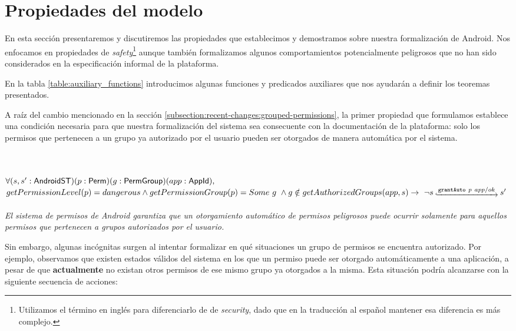 \section{Propiedades del modelo}

En esta sección presentaremos y discutiremos las propiedades que establecimos y demostramos sobre
nuestra formalización de Android. Nos enfocamos en propiedades de \textit{safety}\footnote{Utilizamos
    el término en inglés para diferenciarlo de de \textit{security}, dado que en la traducción al español
    mantener esa diferencia es más complejo.} aunque también formalizamos algunos comportamientos
potencialmente peligrosos que no han sido considerados en la especificación informal de la plataforma.

En la tabla \ref{table:auxiliary_functions} introducimos algunas funciones y predicados auxiliares que
nos ayudarán a definir los teoremas presentados.



A raíz del cambio mencionado en la sección \ref{subsection:recent-changes:grouped-permissions}, la
primer propiedad que formulamos establece una condición necesaria para que nuestra formalización del
sistema sea consecuente con la documentación de la plataforma: solo los permisos que pertenecen a un
grupo ya autorizado por el usuario pueden ser otorgados de manera automática por el sistema.

\begin{prop} \label{section:formalization:property1}
    \mbox{} \\ \\
    $\forall (s,s': \mathsf{AndroidST}) (p:\mathsf{Perm}) (g:\mathsf{PermGroup}) (app:\mathsf{AppId}),$ \\
    $getPermissionLevel(p) = dangerous \land getPermissionGroup(p) = Some\ g\ \land
        g \notin getAuthorizedGroups(app,s)
        \rightarrow\ \neg \Mathexecrel{s}{\texttt{grantAuto}~p~app/ok}{s'}$ \\ \\
    \textit{El sistema de permisos de Android garantiza que un otorgamiento automático de permisos peligrosos puede ocurrir solamente para aquellos permisos que pertenecen a grupos autorizados por el usuario.}
\end{prop}

Sin embargo, algunas incógnitas surgen al intentar formalizar en qué situaciones un grupo de permisos
se encuentra autorizado. Por ejemplo, observamos que existen estados válidos del sistema en los que un
permiso puede ser otorgado automáticamente a una aplicación, a pesar de que \textbf{actualmente} no
existan otros permisos de ese mismo grupo ya otorgados a la misma. Esta situación podría alcanzarse
con la siguiente secuencia de acciones:

